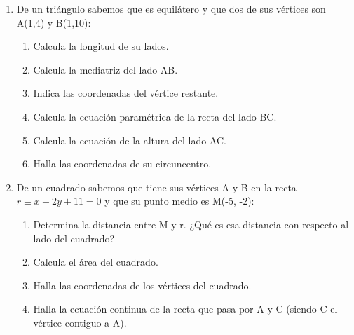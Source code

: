 \begin{enumerate}[topsep=0pt]
	\item De un triángulo sabemos que es equilátero y que dos de sus vértices son A(1,4) y B(1,10):
		\begin{enumerate}[topsep=0pt, label=\arabic*)]
			\item Calcula la longitud de su lados.
			\item Calcula la mediatriz del lado AB.
			\item Indica las coordenadas del vértice restante.
			\item Calcula la ecuación paramétrica de la recta del lado BC.
			\item Calcula la ecuación de la altura del lado AC.
			\item Halla las coordenadas de su circuncentro.
		\end{enumerate}
	
	\item De un cuadrado sabemos que tiene sus vértices A y B en la recta $r \equiv x+2y +11 = 0$ y que su punto medio es M(-5, -2):
		\begin{enumerate}[topsep=0pt, label=\arabic*)]
			\item Determina la distancia entre M y r. ¿Qué es esa distancia con respecto al lado del cuadrado?
			\item Calcula el área del cuadrado.
			\item Halla las coordenadas de los vértices del cuadrado.
			\item Halla la ecuación continua de la recta que pasa por A y C (siendo C el vértice contiguo a A).
		\end{enumerate}
\end{enumerate}


